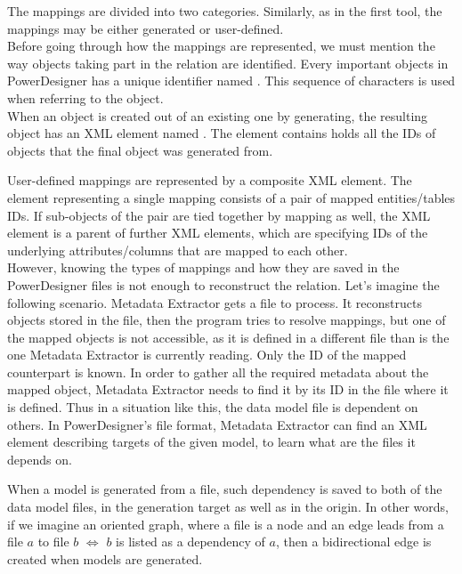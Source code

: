 The mappings are divided into two categories. 
Similarly, as in the first tool, the mappings may be either generated or user-defined. \\ 


Before going through how the mappings are represented, we must mention the way objects taking part in the relation are identified.
Every important objects in PowerDesigner has a unique identifier named . This sequence of characters is used when referring to the object.\\

When an object is created out of an existing one by generating, the resulting object has an XML element named . The element contains holds all the IDs of objects that the final object was generated from.

User-defined mappings are represented by a composite XML element. 
The element representing a single mapping consists of a pair of mapped entities/tables IDs. If sub-objects of the pair are tied together by mapping as well, the XML element is a parent of further XML elements, which are specifying IDs of the underlying attributes/columns that are mapped to each other. \\

However, knowing the types of mappings and how they are saved in the PowerDesigner files is not enough to reconstruct the relation. Let's imagine the following scenario.
Metadata Extractor gets a file to process. It reconstructs objects stored in the file, then the program tries to resolve mappings, but one of the mapped objects is not accessible, as it is defined in a different file than is the one Metadata Extractor is currently reading.
Only the ID of the mapped counterpart is known. 
In order to gather all the required metadata about the mapped object, Metadata Extractor needs to find it by its ID in the file where it is defined.
Thus in a situation like this, the data model file is dependent on others.
In PowerDesigner's file format, Metadata Extractor can find an XML element describing targets of the given model, to learn what are the files it depends on.

When a model is generated from a file, such dependency is saved to both of the data model files, in the generation target as well as in the origin. 
In other words, if we imagine an oriented graph, where a file is a node and an edge leads from a file $a$ to file $b$ $\iff$ $b$ is listed as a dependency of $a$, then a bidirectional edge is created when models are generated.

